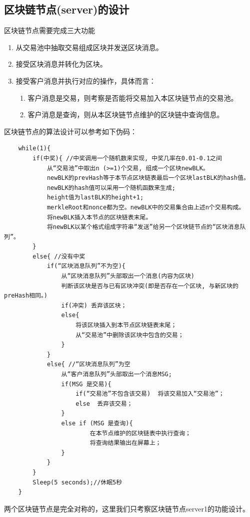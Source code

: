 \documentclass[10pt,a4paper]{article}
\begin{document}
    \subsection{区块链节点(server)的设计}
    \noindent 区块链节点需要完成三大功能
    \begin{enumerate}
        \item 从交易池中抽取交易组成区块并发送区块消息。
        \item 接受区块消息并转化为区块。
        \item 接受客户消息并执行对应的操作，具体而言：
        \begin{enumerate}
            \item 客户消息是交易，则考察是否能将交易加入本区块链节点的交易池。
            \item 客户消息是查询，则从本区块链节点维护的区块链中查询信息。
        \end{enumerate}
    \end{enumerate}
    区块链节点的算法设计可以参考如下伪码：
    \begin{verbatim}
    while(1){
        if(中奖){ //中奖调用一个随机数来实现, 中奖几率在0.01-0.1之间
            从“交易池”中取出n (>=1)个交易, 组成一个区块newBLK。
            newBLK的prevHash等于本节点区块链表最后一个区块lastBLK的hash值。
            newBLK的hash值可以采用一个随机函数来生成;
            height值为lastBLK的height+1;
            merkleRoot和nonce都为空。newBLK中的交易集合由上述n个交易构成。
            将newBLK插入本节点的区块链表末尾。
            将newBLK以某个格式组成字符串“发送”给另一个区块链节点的“区块消息队列”。
        }
        else{ //没有中奖
            if(“区块消息队列”不为空){
                从“区块消息队列”头部取出一个消息(内容为区块)
                判断该区块是否与已有区块冲突(即是否存在一个区块, 与新区块的preHash相同。)
                if(冲突) 丢弃该区块；
                else{
                    将该区块插入到本节点区块链表末尾；
                    从“交易池”中删除该区块中包含的交易；
                }
            }
            else{ //“区块消息队列”为空
                从“客户消息队列”头部取出一个消息MSG;
                if(MSG 是交易){
                    if(“交易池”不包含该交易)  将该交易加入“交易池”；
                    else  丢弃该交易；
                }
                else if (MSG 是查询){
                        在本节点维护的区块链表中执行查询；
                        将查询结果输出在屏幕上；
                }
            }
        }
        Sleep(5 seconds);//休眠5秒
    }
    \end{verbatim}
    两个区块链节点是完全对称的，这里我们只考察区块链节点server1的功能设计。
\end{document}
